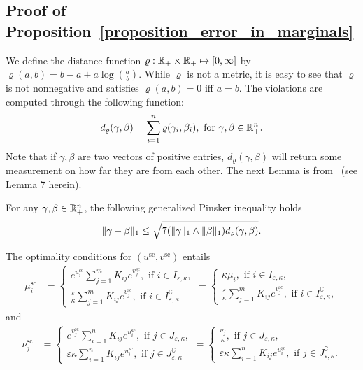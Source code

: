 \subsection{Proof of Proposition~\ref{proposition_error_in_marginals}}

We define the distance function $\varrho: {\mathbb{R}}_+ \times {\mathbb{R}}_+ \mapsto [0, \infty]$ by $\varrho(a,b) = b - a + a \log(\frac ab).$
While $\varrho$ is not a metric, it is easy to see that $\varrho$ is not nonnegative and satisfies $\varrho(a,b) =0$ iff $a=b$.
The violations are computed through the following function: 
\begin{equation*}
	d_{\varrho}(\gamma,\beta) = \sum_{i=1}^n \varrho(\gamma_i,\beta_i), \text{ for } \gamma, \beta \in {\mathbb{R}}^n_+.
\end{equation*}
Note that if $\gamma,\beta$ are two vectors of positive entries, $d_{\varrho}(\gamma,\beta)$ will return some measurement on how far they are from each other. The next Lemma is from~\cite{khalilabid2018} (see Lemma 7 herein).
\begin{lemma}
\label{lem:pinsker}
For any $\gamma, \beta \in {\mathbb{R}}^n_+$, the following generalized Pinsker inequality holds 
\begin{align*}
\|\gamma - \beta\|_1 \leq \sqrt{7 (\|\gamma\|_1\wedge \|\beta\|_1)d_{\varrho}(\gamma,\beta)}.
\end{align*}
\end{lemma}

The optimality conditions for $({u}^{\text{sc}}, {v}^{\text{sc}})$ entails 
\begin{align}
\label{i-th-marginal-mu} 
{\mu}^{\text{sc}}_i  &= 
\begin{cases}
e^{u^{\text{sc}}_i} \sum_{j=1}^m K_{ij} e^{v^{\text{sc}}_j}, \text{ if  }i \in I_{\varepsilon,\kappa},\\
\frac \varepsilon\kappa\sum_{j=1}^m K_{ij} e^{v^{\text{sc}}_j}, \text{ if  }i \in I^\complement_{\varepsilon,\kappa}
\end{cases}
=\begin{cases}
\kappa \mu_i, \text{ if  }i \in I_{\varepsilon,\kappa},\\
\frac \varepsilon\kappa\sum_{j=1}^m K_{ij} e^{v^{\text{sc}}_j}, \text{ if  }i \in I^\complement_{\varepsilon,\kappa},
\end{cases}
\end{align}
and 
\begin{align}
\label{i-th-marginal-nu} 
{\nu}^{\text{sc}}_j  &= 
\begin{cases}
e^{v^{\text{sc}}_j} \sum_{i=1}^n K_{ij} e^{u^{\text{sc}}_i}, \text{ if  }j \in J_{\varepsilon,\kappa},\\
\varepsilon\kappa\sum_{i=1}^n K_{ij} e^{u^{\text{sc}}_i}, \text{ if  }j \in J^\complement_{\varepsilon,\kappa}
\end{cases}
=\begin{cases}
\frac{\nu_j}{\kappa}, \text{ if  }j \in J_{\varepsilon,\kappa},\\
\varepsilon\kappa\sum_{i=1}^n K_{ij} e^{u^{\text{sc}}_i}, \text{ if  }j \in J^\complement_{\varepsilon,\kappa}.
\end{cases}
\end{align}

